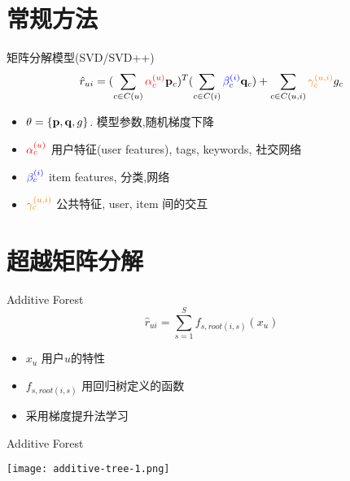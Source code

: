 \documentclass{beamer}
\begin{document}
\section{常规方法}
\begin{frame}{矩阵分解模型(SVD/SVD++)}
    \begin{equation}
        \hat{r}_{ui} = 
        ( 
        \sum_{c\in C(u)} \textcolor{red}{\alpha_c^{(u)}}\bold{p}_c)^T
        (
        \sum_{c\in C(i)} \textcolor{blue}{\beta_c^{(i)}}\bold{q}_c)
        +
        \sum_{c\in C(u,i)} \textcolor{orange}{\gamma_c^{(u,i)}}g_c
    \end{equation}

    \pause
    \begin{itemize}
        \item $\theta = \{\bold{p}, \bold{q}, g\}$. 模型参数,随机梯度下降
        \item $\color{red}\alpha_c^{(u)}$ 用户特征(user features), tags, keywords, 社交网络
        \item $\color{blue}\beta_c^{(i)}$ item features, 分类,网络
        \item $\color{orange}\gamma_c^{(u,i)}$ 公共特征, user, item 间的交互
    \end{itemize}
\end{frame}

\section{超越矩阵分解}
\begin{frame}{Additive Forest}
    \begin{equation}
        \hat{r}_{ui} = 
        \sum_{s=1}^{S} f_{s,root(i,s)}(x_{u})
        \label{}
    \end{equation}
    \begin{itemize}
        \item $x_{u}$ 用户$u$的特性
        \item $f_{s,root(i,s)}$ 用回归树定义的函数
        \item 采用梯度提升法学习
    \end{itemize}
\end{frame}

\begin{frame}{Additive Forest}
    \begin{center}
        \texttt{[image: additive-tree-1.png]}
    \end{center}
\end{frame}
\end{document}

